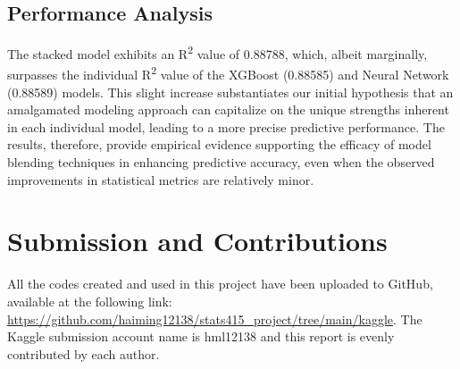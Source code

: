 \documentclass{article}
\begin{document}
\subsection{Performance Analysis}

The stacked model exhibits an R\textsuperscript{2} value of 0.88788, which, albeit marginally, surpasses the individual R\textsuperscript{2} value of the XGBoost (0.88585) and Neural Network (0.88589) models. This slight increase substantiates our initial hypothesis that an amalgamated modeling approach can capitalize on the unique strengths inherent in each individual model, leading to a more precise predictive performance. The results, therefore, provide empirical evidence supporting the efficacy of model blending techniques in enhancing predictive accuracy, even when the observed improvements in statistical metrics are relatively minor.

\section{Submission and Contributions}

All the codes created and used in this project have been uploaded to GitHub, available at the following link: \url{https://github.com/haiming12138/stats415_project/tree/main/kaggle}. The Kaggle submission account name is hml12138 and this report is evenly contributed by each author.

\printbibliography
\end{document}
